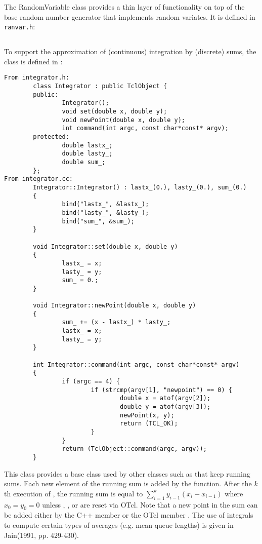 The RandomVariable class provides a thin layer of functionality on top
of the base random number generator that implements random variates.
It is defined in {\tt ranvar.h}:

\subsection{}

To support the approximation of (continuous) integration by (discrete)
sums, the  class is defined in :
\begin{small}
\begin{verbatim}
From integrator.h:
        class Integrator : public TclObject {
        public:
                Integrator();
                void set(double x, double y);
                void newPoint(double x, double y);
                int command(int argc, const char*const* argv);
        protected:
                double lastx_;
                double lasty_;
                double sum_;
        };
From integrator.cc:
        Integrator::Integrator() : lastx_(0.), lasty_(0.), sum_(0.)
        {
                bind("lastx_", &lastx_);
                bind("lasty_", &lasty_);
                bind("sum_", &sum_);
        }

        void Integrator::set(double x, double y)
        {
                lastx_ = x;
                lasty_ = y;
                sum_ = 0.;
        }

        void Integrator::newPoint(double x, double y)
        {
                sum_ += (x - lastx_) * lasty_;
                lastx_ = x;
                lasty_ = y;
        }

        int Integrator::command(int argc, const char*const* argv)
        {
                if (argc == 4) {
                        if (strcmp(argv[1], "newpoint") == 0) {
                                double x = atof(argv[2]);
                                double y = atof(argv[3]);
                                newPoint(x, y);
                                return (TCL_OK);
                        }
                }
                return (TclObject::command(argc, argv));
        }
\end{verbatim}
\end{small}
This class provides a base class used by other classes such
as  that keep running sums.
Each new element of the running sum is added by
the  function.
After the $k$th execution of , the running sum
is equal to $\sum_{i=1}^{k}y_{i-1}(x_i - x_{i-1})$ where
$x_0 = y_0 = 0$ unless , , or 
are reset via OTcl.
Note that a new point in the sum can be added either by the
C++ member  or the OTcl member .
The use of integrals to compute certain types of averages
(e.g. mean queue lengths) is given in Jain(1991, pp. 429-430).
